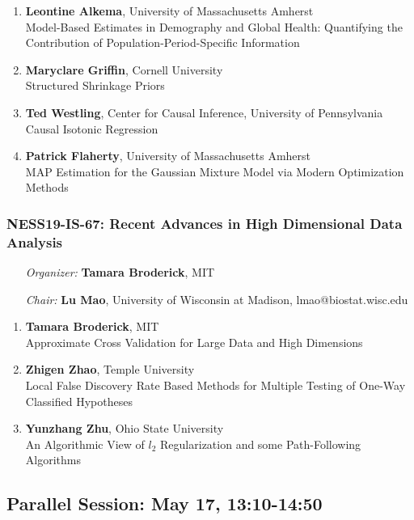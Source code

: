 \begin{enumerate}
\item \textbf{Leontine Alkema}, University of Massachusetts Amherst \\
Model-Based Estimates in Demography and Global Health: Quantifying the Contribution of Population-Period-Specific Information
\item \textbf{Maryclare Griffin}, Cornell University \\
Structured Shrinkage Priors
\item \textbf{Ted Westling}, Center for Causal Inference, University of Pennsylvania \\
Causal Isotonic Regression
\item \textbf{Patrick Flaherty}, University of Massachusetts Amherst \\
MAP Estimation for the Gaussian Mixture Model via Modern Optimization Methods
\end{enumerate}

\subsubsection*{NESS19-IS-67: Recent Advances in High Dimensional Data Analysis}

\begin{enumerate}[align=left]
\item [\emph{Organizer:}] \textbf{Tamara Broderick}, MIT
\item [\emph{Chair:}] \textbf{Lu Mao},  University of Wisconsin at Madison, lmao@biostat.wisc.edu
\end{enumerate}

\begin{enumerate}
\item \textbf{Tamara Broderick}, MIT \\
Approximate Cross Validation for Large Data and High Dimensions
\item \textbf{Zhigen Zhao}, Temple University \\
Local False Discovery Rate Based Methods for Multiple Testing of One-Way Classified Hypotheses
\item \textbf{Yunzhang Zhu}, Ohio State University \\
An Algorithmic View of $l_2$ Regularization and some Path-Following Algorithms
\end{enumerate}

\subsection*{Parallel Session: May 17, 13:10-14:50}

